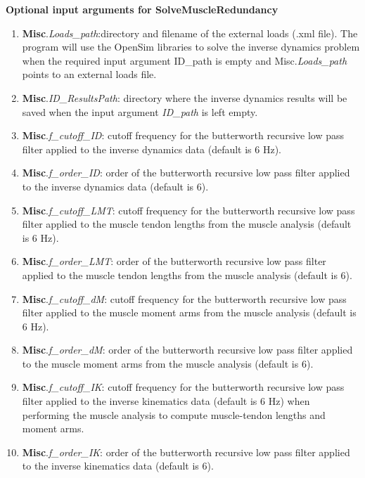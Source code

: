 \documentclass[a4paper,oneside,11pt]{article}
\begin{document}
\textbf{Optional input arguments for SolveMuscleRedundancy}
\begin{enumerate}
	\item \textbf{Misc}.\textit{Loads_path}:directory and filename of the external loads (.xml file). The program will use the OpenSim libraries to solve the inverse dynamics problem when the required input argument ID_path is empty and Misc.\textit{Loads_path} points to an external loads file.
	
	\item \textbf{Misc}.\textit{ID_ResultsPath}: directory where the inverse dynamics results will be saved when the input argument \textit{ID_path} is left empty.
	
	\item \textbf{Misc}.\textit{f_cutoff_ID}: cutoff frequency for the butterworth recursive low pass filter applied to the inverse dynamics data (default is 6 Hz).
	
	\item \textbf{Misc}.\textit{f_order_ID}: order of the butterworth recursive low pass filter applied to the inverse dynamics data (default is 6).
	
	\item \textbf{Misc}.\textit{f_cutoff_LMT}: cutoff frequency for the butterworth recursive low pass filter applied to the muscle tendon lengths from the muscle analysis (default is 6 Hz).
	
	\item \textbf{Misc}.\textit{f_order_LMT}: order of the butterworth recursive low pass filter applied to the muscle tendon lengths from the muscle analysis (default is 6).		
	
	\item \textbf{Misc}.\textit{f_cutoff_dM}: cutoff frequency for the butterworth recursive low pass filter applied to the muscle moment arms from the muscle analysis (default is 6 Hz).
	
	\item \textbf{Misc}.\textit{f_order_dM}: order of the butterworth recursive low pass filter applied to the muscle moment arms from the muscle analysis (default is 6).

	\item \textbf{Misc}.\textit{f_cutoff_IK}: cutoff frequency for the butterworth recursive low pass filter applied to the inverse kinematics data (default is 6 Hz) when performing the muscle analysis to compute muscle-tendon lengths and moment arms.
	
	\item \textbf{Misc}.\textit{f_order_IK}: order of the butterworth recursive low pass filter applied to the inverse kinematics data (default is 6).


\end{enumerate}
\end{document}
